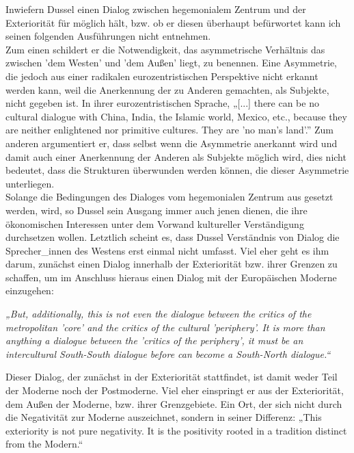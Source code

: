 Inwiefern Dussel einen Dialog zwischen hegemonialem Zentrum und der Exteriorität
für möglich hält, bzw. ob er diesen überhaupt befürwortet kann ich seinen
folgenden Ausführungen nicht entnehmen. \\
Zum einen schildert er die
Notwendigkeit, das asymmetrische Verhältnis das zwischen 'dem Westen' und 'dem
Außen' liegt, zu benennen. Eine Asymmetrie, die jedoch aus einer radikalen
eurozentristischen Perspektive nicht erkannt werden kann, weil die Anerkennung
der zu Anderen gemachten, als Subjekte, nicht gegeben ist. In ihrer
eurozentristischen Sprache,  „[...] there can be no cultural dialogue with
China, India, the Islamic world, Mexico, etc., because they are neither
enlightened nor primitive cultures. They are 'no man's land'.”\footnotemark
{} Zum anderen argumentiert er, dass selbst wenn die
Asymmetrie anerkannt wird und damit auch einer Anerkennung der Anderen als
Subjekte möglich wird, dies nicht bedeutet, dass die Strukturen überwunden
werden können, die dieser Asymmetrie unterliegen.\\
 Solange die Bedingungen des
Dialoges vom hegemonialen Zentrum aus gesetzt werden, wird, so Dussel sein
Ausgang immer auch jenen dienen, die ihre ökonomischen Interessen unter dem
Vorwand kultureller Verständigung durchsetzen wollen.\footnotemark
{} Letztlich scheint es, dass Dussel Verständnis von Dialog die
Sprecher\_innen des Westens erst einmal nicht umfasst. Viel eher geht es ihm
darum, zunächst einen Dialog innerhalb der Exteriorität bzw. ihrer Grenzen zu
schaffen, um im Anschluss hieraus einen Dialog mit der Europäischen Moderne
einzugehen:
\begin{myenv}
    \textit{„But, additionally, this is not even the dialogue between the critics of the metropolitan 'core' and the critics of the cultural 'periphery'. It is more than anything a dialogue between the 'critics of the periphery', it must be an intercultural South-South dialogue before can become a South-North dialogue.“\footnotemark {}}
\end{myenv}
Dieser Dialog, der zunächst in der Exteriorität stattfindet, ist damit weder
Teil der Moderne noch der Postmoderne. Viel eher einspringt er aus der
Exteriorität, dem Außen der Moderne, bzw. ihrer Grenzgebiete. Ein Ort, der sich
nicht durch die Negativität zur Moderne auszeichnet, sondern in seiner
Differenz: „This exteriority is not pure negativity. It is the positivity rooted
in a tradition distinct from the Modern.“\footnotemark {}\\

